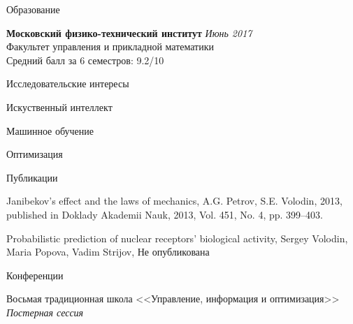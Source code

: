 \documentclass{resume} %
\begin{document}

\begin{rSection}{Образование}

{\bf Московский физико-технический институт} \hfill {\em Июнь 2017} \\ 
Факультет управления и прикладной математики\\
Средний балл за 6 семестров: 9.2/10

\end{rSection}


\begin{rSection}{Исследовательские интересы}
	\item Искуственный интеллект
	\item Машинное обучение
	\item Оптимизация

\end{rSection}


\begin{rSection}{Публикации}
	\item Janibekov’s effect and the laws of mechanics, A.G. Petrov, S.E. Volodin, 2013, published in Doklady Akademii Nauk, 2013, Vol. 451, No. 4, pp. 399–403.
	
	\item Probabilistic prediction of nuclear receptors’ biological activity, Sergey Volodin, Maria Popova, Vadim Strijov, Не опубликована
	
\end{rSection}

\begin{rSection}{Конференции}
\item Восьмая традиционная школа <<Управление, информация и оптимизация>>\\
{\em Постерная сессия}
\end{rSection}
\end{document}
